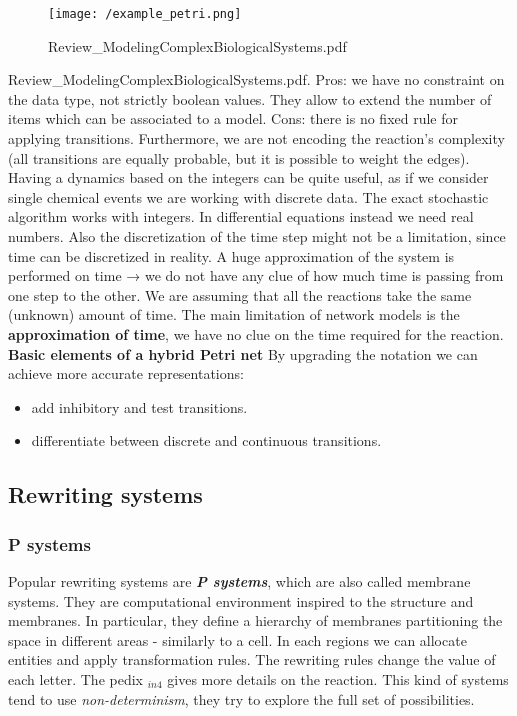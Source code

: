   \begin{figure}
    \centering
    \texttt{[image: /example\_petri.png]}
    \caption{Review\_ModelingComplexBiologicalSystems.pdf}
  \end{figure}

  Review\_ModelingComplexBiologicalSystems.pdf.
  Pros: we have no constraint on the data type, not strictly boolean values.
  They allow to extend the number of items which can be associated to a model.
  Cons: there is no fixed rule for applying transitions.
  Furthermore, we are not encoding the reaction's complexity (all transitions are equally probable, but it is possible to weight the edges).
  Having a dynamics based on the integers can be quite useful, as if we consider single chemical events we are working with discrete data.
  The exact stochastic algorithm works with integers.
  In differential equations instead we need real numbers.
  Also the discretization of the time step might not be a limitation, since time can be discretized in reality.
  A huge approximation of the system is performed on time → we do not have any clue of how much time is passing from one step to the other.
  We are assuming that all the reactions take the same (unknown) amount of time.
  The main limitation of network models is the \textbf{approximation of time}, we have no clue on the time required for the reaction.
  \textbf{Basic elements of a hybrid Petri net} By upgrading the notation we can achieve more accurate representations:

  \begin{itemize}
    \item add inhibitory and test transitions.
    \item differentiate between discrete and continuous transitions.
  \end{itemize}

  \subsection{Rewriting systems}

    \subsubsection{P systems}
    Popular rewriting systems are \textbf{\emph{P systems}}, which are also called membrane systems.
    They are computational environment inspired to the structure and membranes.
    In particular, they define a hierarchy of membranes partitioning the space in different areas - similarly to a cell.
    In each regions we can allocate entities and apply transformation rules.
    The rewriting rules change the value of each letter.
    The pedix \(_{in4}\) gives more details on the reaction.
    This kind of systems tend to use \emph{non-determinism}, they try to explore the full set of possibilities.

